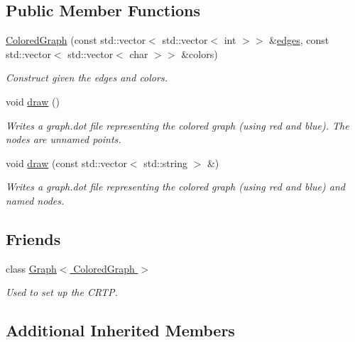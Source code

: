 \subsection*{Public Member Functions}
\begin{DoxyCompactItemize}
\item 
\hyperlink{classMackey_1_1ColoredGraph_a9ee26fcb36db12b5dd17702f4dc06d25}{Colored\+Graph} (const std\+::vector$<$ std\+::vector$<$ int $>$$>$ \&\hyperlink{classMackey_1_1Graph_a0a2aeb9b16c5f0e583f360943b7f340f}{edges}, const std\+::vector$<$ std\+::vector$<$ char $>$$>$ \&colors)
\begin{DoxyCompactList}\small\item\em Construct given the edges and colors. \end{DoxyCompactList}\item 
void \hyperlink{classMackey_1_1ColoredGraph_a8ed05073805b34a0087a7ed94e889694}{draw} ()
\begin{DoxyCompactList}\small\item\em Writes a graph.\+dot file representing the colored graph (using red and blue). The nodes are unnamed points. \end{DoxyCompactList}\item 
void \hyperlink{classMackey_1_1ColoredGraph_a912a6e5cb94386d9ff6510e968b41e7d}{draw} (const std\+::vector$<$ std\+::string $>$ \&)
\begin{DoxyCompactList}\small\item\em Writes a graph.\+dot file representing the colored graph (using red and blue) and named nodes. \end{DoxyCompactList}\end{DoxyCompactItemize}
\subsection*{Friends}
\begin{DoxyCompactItemize}
\item 
class \hyperlink{classMackey_1_1ColoredGraph_a2debfc8158c19d7b93550156a3e2676a}{Graph$<$ Colored\+Graph $>$}
\begin{DoxyCompactList}\small\item\em Used to set up the C\+R\+TP. \end{DoxyCompactList}\end{DoxyCompactItemize}
\subsection*{Additional Inherited Members}


